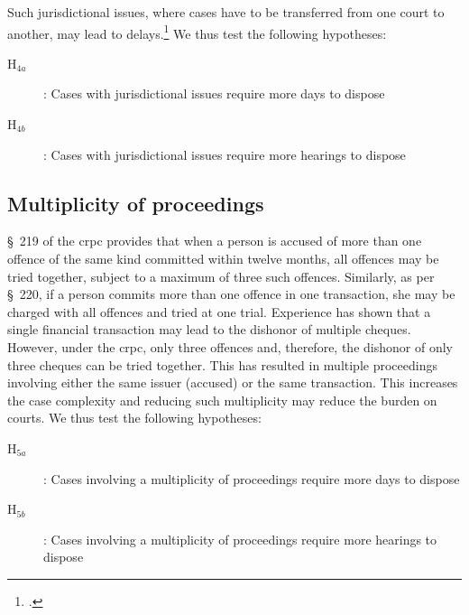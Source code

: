 \documentclass[12pt,a4paper]{article}
\begin{document}
		Such jurisdictional issues, where cases have to be transferred from one court to another, may lead to delays.\footcite{sc2020_138, amicus2020_submission} We thus test the following hypotheses:
		
		\begin{description}
			\item[H$_{4a}$]: Cases with jurisdictional issues require more days to dispose
			\item[H$_{4b}$]: Cases with jurisdictional issues require more hearings to dispose
		\end{description}
		
		\subsection{Multiplicity of proceedings}
		
		\S~219 of the \gls{crpc} provides that when a person is accused of more than one offence of the same kind committed within twelve months, all offences may be tried together, subject to a maximum of three such offences. Similarly, as per \S~220, if a person commits more than one offence in one transaction, she may be charged with all offences and tried at one trial. Experience has shown that a single financial transaction may lead to the dishonor of multiple cheques. However, under the \gls{crpc}, only three offences and, therefore, the dishonor of only three cheques can be tried together. This has resulted in multiple proceedings involving either the same issuer (accused) or the same transaction. This increases the case complexity and reducing such multiplicity may reduce the burden on courts. We thus test the following hypotheses:
		
		\begin{description}
			\item[H$_{5a}$]: Cases involving a multiplicity of proceedings require more days to dispose
			\item[H$_{5b}$]: Cases involving a multiplicity of proceedings require more hearings to dispose
		\end{description}
		
\end{document}
